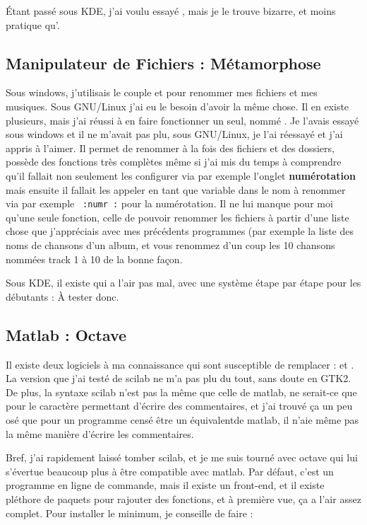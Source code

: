 \documentclass[a4paper,twoside]{article}
\begin{document}
Étant passé sous KDE, j'ai voulu essayé , mais je le trouve bizarre, et moins pratique qu'.

\subsection{Manipulateur de Fichiers : Métamorphose}
Sous windows, j'utilisais le couple  et  pour renommer mes fichiers et mes musiques. Sous GNU/Linux j'ai eu le besoin d'avoir la même chose. Il en existe plusieurs, mais j'ai réussi à en faire fonctionner un seul, nommé . Je l'avais essayé sous windows et il ne m'avait pas plu, sous GNU/Linux, je l'ai réessayé et j'ai appris à l'aimer. Il permet de renommer à la fois des fichiers et des dossiers, possède des fonctions très complètes même si j'ai mis du temps à comprendre qu'il fallait non seulement les configurer via par exemple l'onglet \textbf{numérotation} mais ensuite il fallait les appeler en tant que variable dans le nom à renommer via par exemple \verb| :numr :| pour la numérotation. Il ne lui manque pour moi qu'une seule fonction, celle de pouvoir renommer les fichiers à partir d'une liste chose que j'appréciais avec mes précédents programmes (par exemple la liste des noms de 
chansons d'un album, et vous renommez d'un coup les 10 chansons nommées track 1 à 10 de la bonne façon.

Sous KDE, il existe  qui a l'air pas mal, avec une système étape par étape pour les débutants : À tester donc.

\subsection{Matlab : Octave}\label{sec:matlab}
Il existe deux logiciels à ma connaissance qui sont susceptible de remplacer  :  et . La version que j'ai testé de scilab ne m'a pas plu du tout, sans doute en GTK2. De plus, la syntaxe scilab n'est pas la même que celle de matlab, ne serait-ce que pour le caractère permettant d'écrire des commentaires, et j'ai trouvé ça un peu osé que pour un programme censé être un \og équivalent\fg de matlab, il n'aie même pas la même manière d'écrire les commentaires.

Bref, j'ai rapidement laissé tomber scilab, et je me suis tourné avec octave qui lui s'évertue beaucoup plus à être compatible avec matlab. Par défaut, c'est un programme en ligne de commande, mais il existe un front-end, et il existe pléthore de paquets pour rajouter des fonctions, et à première vue, ça a l'air assez complet. Pour installer le minimum, je conseille de faire :
\end{document}

